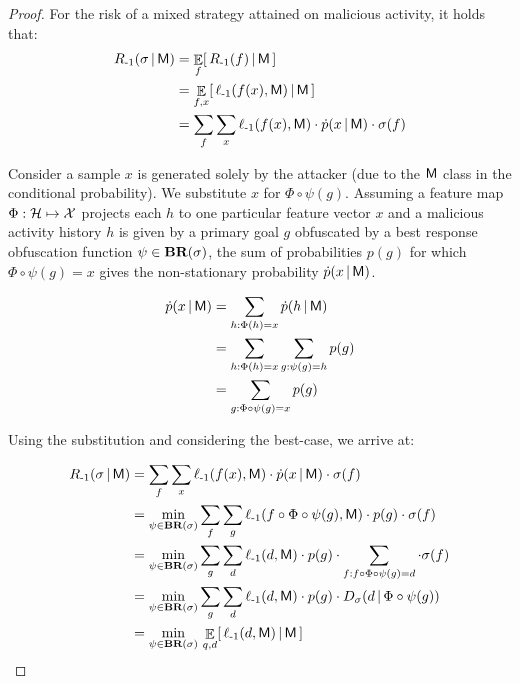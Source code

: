 \begin{proof}

For the risk of a mixed strategy attained on malicious activity, it holds that:
\begin{align}
    R_{{\text{-}1}}(\sigma \,|\, \mathsf{M}) &= \mathop{\mathbb{E}}_f [\, R_{{\text{-}1}}(f) \,|\, \mathsf{M} \,] \\
    &= \mathop{\mathbb{E}}_{f, x} [\, \ell_{{\text{-}1}}(f(x), \mathsf{M}) \,|\, \mathsf{M} \,] \\
    &= \sum_f \sum_x \ell_{{\text{-}1}}(f(x), \mathsf{M})  \cdot  \dot{p}(x \,|\, \mathsf{M})  \cdot  \sigma(f)
\end{align}

Consider a sample $x$ is generated solely by the attacker (due to the $\mathsf{M}$ class in the conditional probability). We substitute $x$ for $\Phi \circ \psi (g)$. Assuming a feature map $\Phi: \mathcal{H} \mapsto \mathcal{X}$ projects each $h$ to one particular feature vector $x$ and a malicious activity history $h$ is  given by a primary goal $g$ obfuscated by a best response obfuscation function $\psi \in \textbf{BR}(\sigma)$, the sum of probabilities $p(g)$ for which $\Phi \circ \psi(g) = x$ gives the non-stationary probability $\dot{p} (x \,|\, \mathsf{M})$.

\begin{align}
    \dot{p} (x \,|\, \mathsf{M}) &= \sum_{h: \Phi(h) = x} \dot{p}(h \,|\, \mathsf{M}) \\
    &= \sum_{h: \Phi(h) = x} \sum_{g: \psi(g) = h} p(g) \\
    &= \sum_{g: \Phi \circ \psi(g) = x} p(g)
\end{align}

Using the substitution and considering the best-case, we arrive at:

\begin{align}
    R_{{\text{-}1}}(\sigma \,|\, \mathsf{M}) &= \sum_f \sum_x \ell_{{\text{-}1}}(f(x), \mathsf{M})  \cdot  \dot{p}(x \,|\, \mathsf{M})  \cdot  \sigma(f) \\
    &= \min_{\psi \in \textbf{BR}(\sigma)}
        \sum_f \sum_g \ell_{{\text{-}1}}(f \circ \Phi \circ \psi(g), \mathsf{M})  \cdot p(g)  \cdot \sigma(f) \\
    &= \min_{\psi \in \textbf{BR}(\sigma)}
        \sum_g \sum_d \ell_{{\text{-}1}}(d, \mathsf{M}) \cdot p(g)  \cdot \sum_{f: f \circ \Phi \circ \psi(g) = d} \cdot \sigma(f) \\
    &= \min_{\psi \in \textbf{BR}(\sigma)}
        \sum_g \sum_d \ell_{{\text{-}1}}(d, \mathsf{M}) \cdot p(g) \cdot D_\sigma(d \,|\, \Phi \circ \psi(g)) \\
    &= \min_{\psi \in \textbf{BR}(\sigma) } \,
        \mathop{\mathbb{E}}_{q, d} [\, \ell_{{\text{-}1}} (d, \mathsf{M}) \,|\, \mathsf{M} \,]
\end{align}


\end{proof}
